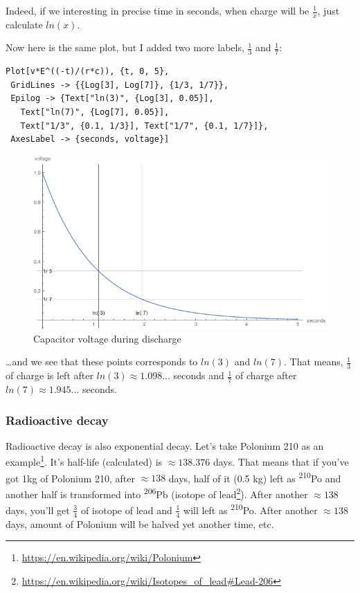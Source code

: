 Indeed, if we interesting in precise time in seconds, when charge will be $\frac{1}{x}$, just calculate $ln(x)$.

Now here is the same plot, but I added two more labels, $\frac{1}{3}$ and $\frac{1}{7}$:

\begin{lstlisting}[caption=Wolfram Mathematica]
Plot[v*E^((-t)/(r*c)), {t, 0, 5}, 
 GridLines -> {{Log[3], Log[7]}, {1/3, 1/7}},
 Epilog -> {Text["ln(3)", {Log[3], 0.05}], 
   Text["ln(7)", {Log[7], 0.05}],
   Text["1/3", {0.1, 1/3}], Text["1/7", {0.1, 1/7}]}, 
 AxesLabel -> {seconds, voltage}]
\end{lstlisting}

\begin{figure}[H]
\centering
\includegraphics[scale=0.66]{log/capacitor_discharge2.png}
\caption{Capacitor voltage during discharge}
\end{figure}

\dots and we see that these points corresponds to $ln(3)$ and $ln(7)$.
That means, $\frac{1}{3}$ of charge is left after $ln(3) \approx 1.098...$ seconds and $\frac{1}{7}$ of charge after $ln(7) \approx 1.945...$ seconds.

\subsubsection{Radioactive decay}

Radioactive decay is also exponential decay.
Let's take Polonium 210 as an example\footnote{\url{https://en.wikipedia.org/wiki/Polonium}}.
It's half-life (calculated) is $\approx 138.376$ days.
That means that if you've got 1kg of Polonium 210, after $\approx 138$ days, half of it (0.5 kg) left as \textsuperscript{210}Po and 
another half is transformed into \textsuperscript{206}Pb (isotope of lead\footnote{\url{https://en.wikipedia.org/wiki/Isotopes_of_lead\#Lead-206}}).
After another $\approx 138$ days, you'll get $\frac{3}{4}$ of isotope of lead and $\frac{1}{4}$ will left as \textsuperscript{210}Po.
After another $\approx 138$ days, amount of Polonium will be halved yet another time, etc.

